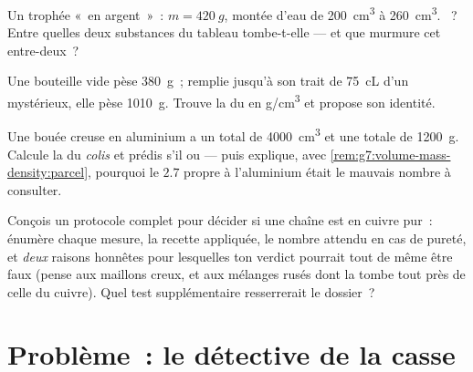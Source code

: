 \begin{exercise}[$\star\star$]\label{exo:g7:volume-mass-density:9}
Un trophée «~en argent~»~: $m = \qty{420}{g}$, montée d'eau de
\qty{200}{cm^3} à \qty{260}{cm^3}. ~? Entre quelles
deux substances du tableau tombe-t-elle --- et que murmure cet
entre-deux~?
\end{exercise}

\begin{exercise}[$\star\star$]\label{exo:g7:volume-mass-density:10}
Une bouteille vide pèse \qty{380}{g}~; remplie jusqu'à son trait de
\qty{75}{cL} d'un  mystérieux, elle pèse \qty{1010}{g}. Trouve
la  du  en \unit{g/cm^3} et propose son
identité.
\end{exercise}

\begin{exercise}[$\star\star$]\label{exo:g7:volume-mass-density:11}
Une bouée creuse en aluminium a un  total de \qty{4000}{cm^3}
et une  totale de \qty{1200}{g}. Calcule la  du
\emph{colis} et prédis s'il  ou  --- puis explique, avec
\cref{rem:g7:volume-mass-density:parcel}, pourquoi le $2.7$ propre à
l'aluminium était le mauvais nombre à consulter.
\end{exercise}

\begin{exercise}[$\star\star\star$]\label{exo:g7:volume-mass-density:12}
Conçois un protocole complet pour décider si une chaîne est en cuivre
pur~: énumère chaque mesure, la recette appliquée, le nombre attendu
en cas de pureté, et \emph{deux} raisons honnêtes pour lesquelles ton
verdict pourrait tout de même être faux (pense aux maillons creux, et
aux mélanges rusés dont la  tombe tout près de celle
du cuivre). Quel test supplémentaire resserrerait le dossier~?
\end{exercise}

\section{Problème~: le détective de la casse}

